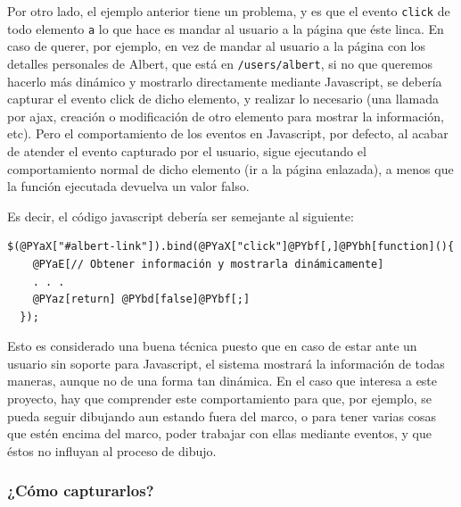 Por otro lado, el ejemplo anterior tiene un problema, y es que el evento \texttt{click} de todo elemento \texttt{a} lo que hace es mandar al usuario a la página que éste linca. En caso de querer, por ejemplo, en vez de mandar al usuario a la página con los detalles personales de Albert, que está en \texttt{/users/albert}, si no que queremos hacerlo más dinámico y mostrarlo directamente mediante Javascript, se debería capturar el evento click de dicho elemento, y realizar lo necesario (una llamada por ajax, creación o modificación de otro elemento para mostrar la información, etc). Pero el comportamiento de los eventos en Javascript, por defecto, al acabar de atender el evento capturado por el usuario, sigue ejecutando el comportamiento normal de dicho elemento (ir a la página enlazada), a menos que la función ejecutada devuelva un valor falso.

Es decir, el código javascript debería ser semejante al siguiente:
\begin{Verbatim}[commandchars=@\[\]]
  $(@PYaX["#albert-link"]).bind(@PYaX["click"]@PYbf[,]@PYbh[function](){
    @PYaE[// Obtener información y mostrarla dinámicamente]
    . . .
    @PYaz[return] @PYbd[false]@PYbf[;]
  });
\end{Verbatim}


Esto es considerado una buena técnica puesto que en caso de estar ante un usuario sin soporte para Javascript, el sistema mostrará la información de todas maneras, aunque no de una forma tan dinámica. En el caso que interesa a este proyecto, hay que comprender este comportamiento para que, por ejemplo, se pueda seguir dibujando aun estando fuera del marco, o para tener varias cosas que estén encima del marco, poder trabajar con ellas mediante eventos, y que éstos no influyan al proceso de dibujo.


\subsubsection{¿Cómo capturarlos?} %
\label{ssub:como_capturarlos}

